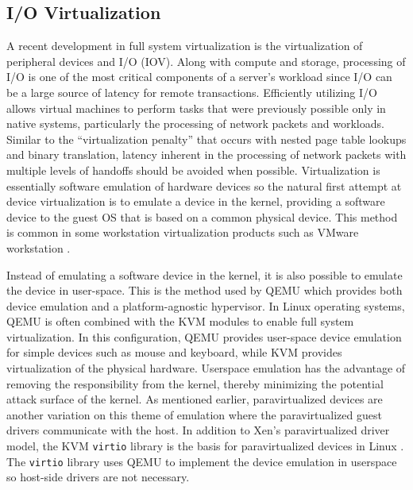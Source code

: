 \subsection{I/O Virtualization}
\label{sec:vt_io}
A recent development in full system virtualization is the virtualization of peripheral devices and I/O (IOV).
Along with compute and storage, processing of I/O is one of the most critical components of a server's workload since I/O can be a large source of latency for remote transactions.
Efficiently utilizing I/O allows virtual machines to perform tasks that were previously possible only in native systems, particularly the processing of network packets and workloads.
Similar to the ``virtualization penalty'' that occurs with nested page table lookups and binary translation, latency inherent in the processing of network packets with multiple levels of handoffs should be avoided when possible.
Virtualization is essentially software emulation of hardware devices so the natural first attempt at device virtualization is to emulate a device in the kernel, providing a software device to the guest OS that is based on a common physical device.
This method is common in some workstation virtualization products such as VMware workstation \autocite{_jones_1}.

Instead of emulating a software device in the kernel, it is also possible to emulate the device in user-space.
This is the method used by QEMU which provides both device emulation and a platform-agnostic hypervisor.
In Linux operating systems, QEMU is often combined with the KVM modules to enable full system virtualization. 
In this configuration, QEMU provides user-space device emulation for simple devices such as mouse and keyboard, while KVM provides virtualization of the physical hardware.
Userspace emulation has the advantage of removing the responsibility from the kernel, thereby minimizing the potential attack surface of the kernel.
As mentioned earlier, paravirtualized devices are another variation on this theme of emulation where the paravirtualized guest drivers communicate with the host.
In addition to Xen's paravirtualized driver model, the KVM \texttt{virtio} library is the basis for paravirtualized devices in Linux \autocite{_virtio_1}.
The \texttt{virtio} library uses QEMU to implement the device emulation in userspace so host-side drivers are not necessary.

